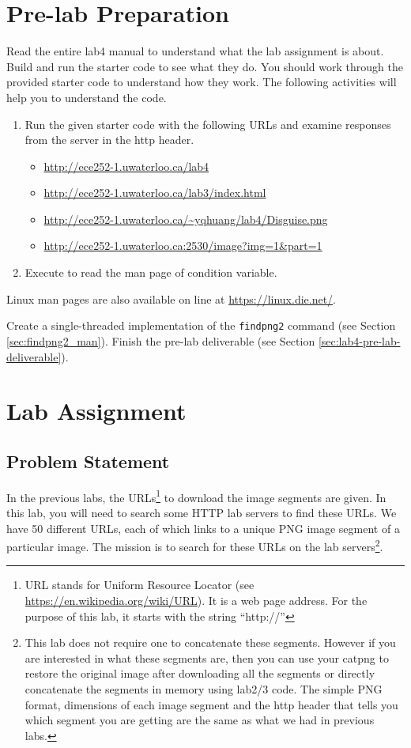 \section{Pre-lab Preparation}
Read the entire lab4 manual to understand what the lab assignment is about. Build and run the starter code to see what they do. You should work through the provided starter code to understand how they work. The following activities will help you to understand the code.
\begin{enumerate}
\item Run the given starter code with the following URLs and examine responses from the server in the http header. 
  \begin{itemize}
  \item \url{http://ece252-1.uwaterloo.ca/lab4}
  \item \url{http://ece252-1.uwaterloo.ca/lab3/index.html}
  \item \url{http://ece252-1.uwaterloo.ca/~yqhuang/lab4/Disguise.png}
  \item \url{http://ece252-1.uwaterloo.ca:2530/image?img=1&part=1}
  \end{itemize}
\item Execute  to read the man page of condition variable.
\end{enumerate}
Linux man pages are also available on line at \url{https://linux.die.net/}.

Create a single-threaded implementation of the \verb+findpng2+ command (see Section \ref{sec:findpng2_man}). Finish the pre-lab deliverable (see Section \ref{sec:lab4-pre-lab-deliverable}).

\section{Lab Assignment}
\subsection{Problem Statement}
In the previous labs, the URLs\footnote{URL stands for Uniform Resource Locator (see \url{https://en.wikipedia.org/wiki/URL}). It is a web page address. For the purpose of this lab, it starts with the string ``http://''} to download the image segments are given. In this lab, you will need to search some HTTP lab servers to find these URLs. We have 50 different URLs, each of which links to a unique PNG image segment of a particular image. The mission is to search for these URLs on the lab servers\footnote{This lab does not require one to concatenate these segments. However if you are interested in what these segments are, then you can use your catpng to restore the original image after downloading all the segments or directly concatenate the segments in memory using lab2/3 code. The simple PNG format, dimensions of each image segment and the http header that tells you which segment you are getting are the same as what we had in previous labs.}.

